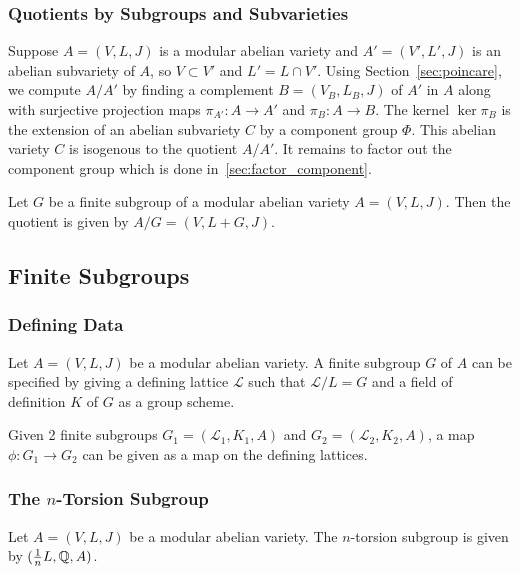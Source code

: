 \documentclass{article}
\begin{document}
\subsubsection{Quotients by Subgroups and Subvarieties}

\label{sec:quotients}

Suppose $A = (V, L, J)$ is a modular abelian variety and $A' = (V',
L', J)$ is an abelian subvariety of $A$, so $V\subset V'$ and $L' =
L\cap V'$. Using Section~\ref{sec:poincare}, we compute $A/A'$ by
finding a complement $B=(V_B,L_B,J)$ of $A'$ in $A$ along with
surjective projection maps $\pi_{A'}: A \to A'$ and $\pi_B: A\to B$.
The kernel $\ker \pi_B$ is the extension of an abelian subvariety $C$ by a
component group $\Phi$. This abelian variety $C$ is isogenous to the quotient
$A/A'$. It remains to factor out the component group which is done
in~\ref{sec:factor_component}.


Let $G$ be a finite subgroup of a modular abelian variety $A=(V, L, J)$. Then
the quotient is given by $A/G = (V, L+G, J)$.

\subsection{Finite Subgroups} 

\subsubsection{Defining Data}

Let $A=(V, L, J)$ be a modular abelian variety. A finite subgroup $G$ of $A$
can be specified by giving a defining lattice $\mathcal{L}$ such that
$\mathcal{L}/L = G$ and a field of definition $K$ of $G$ as a group scheme. 

Given 2 finite subgroups $G_1=(\mathcal{L}_1, K_1, A)$ and $G_2=(\mathcal{L}_2,
K_2, A)$, a map $\phi: G_1\to G_2$ can be given as a map on the defining
lattices.

\subsubsection{The $n$-Torsion Subgroup}

Let $A=(V, L, J)$ be a modular abelian variety. The $n$-torsion subgroup is
given by $(\frac{1}{n} L, \mathbb{Q}, A)$.
\end{document}
